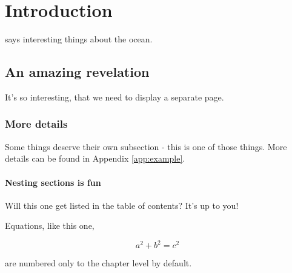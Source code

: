 \chapter{Introduction}
\label{chap:intro}

\citet{Munk1950} says interesting things about the ocean. 
\newpage
\section{An amazing revelation}
It's so interesting, that we need to display a separate page.

\subsection{More details}
Some things deserve their own subsection - this is one of those things. More details can be found in Appendix \ref{app:example}.

\subsubsection{Nesting sections is fun}
Will this one get listed in the table of contents? It's up to you! 

Equations, like this one,

\begin{equation}
a^{2} + b^{2} = c^{2}
\end{equation}


 are numbered only to the chapter level by default.